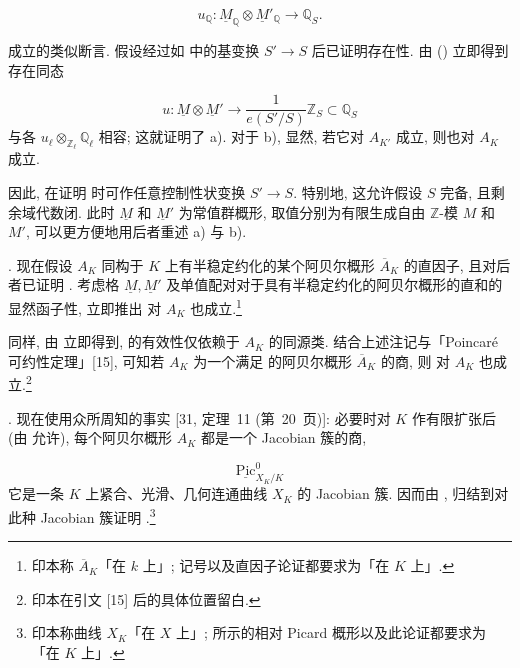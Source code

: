 \begin{equation*}
u_{\mathbb Q}:\underline M_{\mathbb Q}\otimes
 \underline M'_{\mathbb Q}\longrightarrow\mathbb Q_S.
\end{equation*}

成立的类似断言. 假设经过如  中的基变换 $S'\longrightarrow S$ 后已证明存在性. 由 () 立即得到存在同态

\begin{equation*}
u:\underline M\otimes\underline M'
 \longrightarrow\frac{1}{e(S'/S)}\mathbb Z_S\subset\mathbb Q_S
\end{equation*}
与各 $u_\ell\otimes_{\mathbb Z_\ell}\mathbb Q_\ell$ 相容; 这就证明了 a). 对于 b), 显然, 若它对 $A_{K'}$ 成立, 则也对 $A_K$ 成立.

因此, 在证明  时可作任意控制性状变换 $S'\longrightarrow S$. 特别地, 这允许假设 $S$ 完备, 且剩余域代数闭. 此时 $\underline M$ 和 $\underline M'$ 为常值群概形, 取值分别为有限生成自由 $\mathbb Z$-模 $M$ 和 $M'$, 可以更方便地用后者重述 a) 与 b).

\smallskip
\noindent
{}. 现在假设 $A_K$ 同构于 $K$ 上有半稳定约化的某个阿贝尔概形 $\overline A_K$ 的直因子, 且对后者已证明 . 考虑格 $\underline M,\underline M'$ 及单值配对对于具有半稳定约化的阿贝尔概形的直和的显然函子性, 立即推出  对 $A_K$ 也成立.\footnote{印本称 $\overline A_K$「在 $k$ 上」; 记号以及直因子论证都要求为「在 $K$ 上」.}

同样, 由  立即得到,  的有效性仅依赖于 $A_K$ 的同源类. 结合上述注记与「Poincar\'e 可约性定理」[15], 可知若 $A_K$ 为一个满足  的阿贝尔概形 $\overline A_K$ 的商, 则  对 $A_K$ 也成立.\footnote{印本在引文 [15] 后的具体位置留白.}

\smallskip
\noindent
{}. 现在使用众所周知的事实 [31, 定理~11 (第~20~页)]: 必要时对 $K$ 作有限扩张后 (由  允许), 每个阿贝尔概形 $A_K$ 都是一个 Jacobian 簇的商,

\begin{equation*}
\underline{\operatorname{Pic}}^0_{X_K/K}
\end{equation*}
它是一条 $K$ 上紧合、光滑、几何连通曲线 $X_K$ 的 Jacobian 簇. 因而由 , 归结到对此种 Jacobian 簇证明 .\footnote{印本称曲线 $X_K$「在 $X$ 上」; 所示的相对 Picard 概形以及此论证都要求为「在 $K$ 上」.}

